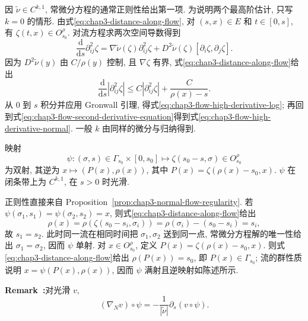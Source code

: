 \begin{Proof}
因 $\widetilde\nu\in C^{k,1}$, 常微分方程的通常正则性给出第一项. 为说明两个最高阶估计, 只写 $k=0$ 的情形. 由式\eqref{eq:chap3-distance-along-flow}, 对 $(s,x)\in E$ 和 $t\in[0,s]$, 有 $\zeta(t,x)\in O_{s_0}^\rho$. 对流方程求两次空间导数得到
\begin{equation}
 \frac{\mathrm d}{\mathrm ds}\partial_{ij}^2\zeta
 =\nabla\widetilde\nu(\zeta)\partial_{ij}^2\zeta
 +D^2\widetilde\nu(\zeta)[\partial_i\zeta,\partial_j\zeta].
 \label{eq:chap3-flow-second-derivative-equation}
\end{equation}
因为 $D^2\widetilde\nu(y)$ 由 $C/\rho(y)$ 控制, 且 $\nabla\zeta$ 有界, 式\eqref{eq:chap3-distance-along-flow}给出
\[
 \frac{\mathrm d}{\mathrm ds}|\partial_{ij}^2\zeta|
 \leq C|\partial_{ij}^2\zeta|+\frac C{\rho(x)-s}.
\]
从 $0$ 到 $s$ 积分并应用 Gronwall 引理, 得式\eqref{eq:chap3-flow-high-derivative-log}; 再回到式\eqref{eq:chap3-flow-second-derivative-equation}得到式\eqref{eq:chap3-flow-high-derivative-normal}. 一般 $k$ 由同样的微分与归纳得到.
\end{Proof}

\begin{Proposition}
\label{prop:chap3-boundary-strip-parametrization}
映射
\[
 \psi:(\sigma,s)\in\Gamma_{s_0}\times[0,s_0]
 \longmapsto\zeta(s_0-s,\sigma)\in O_{s_0}^\rho
\]
为双射, 其逆为 $x\mapsto(P(x),\rho(x))$, 其中 $P(x)=\zeta(\rho(x)-s_0,x)$. $\psi$ 在闭条带上为 $C^{k,1}$, 在 $s>0$ 时光滑.
\end{Proposition}

\begin{Proof}
正则性直接来自 Proposition~\ref{prop:chap3-normal-flow-regularity}. 若 $\psi(\sigma_1,s_1)=\psi(\sigma_2,s_2)=x$, 则式\eqref{eq:chap3-distance-along-flow}给出
\[
 \rho(x)=\rho(\zeta(s_0-s_i,\sigma_i))
 =\rho(\sigma_i)-(s_0-s_i)=s_i,
\]
故 $s_1=s_2$. 此时同一流在相同时间把 $\sigma_1,\sigma_2$ 送到同一点, 常微分方程解的唯一性给出 $\sigma_1=\sigma_2$, 因而 $\psi$ 单射. 对 $x\in O_{s_0}^\rho$, 定义 $P(x)=\zeta(\rho(x)-s_0,x)$. 则式\eqref{eq:chap3-distance-along-flow}给出 $\rho(P(x))=s_0$, 即 $P(x)\in\Gamma_{s_0}$; 流的群性质说明 $x=\psi(P(x),\rho(x))$, 因而 $\psi$ 满射且逆映射如陈述所示.
\end{Proof}

\par\noindent{}\textbf{Remark~\thechapterthreesectionthreeremark:}\label{rem:chap3-boundary-volume-parametrization}\quad 对光滑 $v$,
\begin{equation}
 (\nabla_Nv)\circ\psi=-\frac1{|\widetilde\nu|}\partial_s(v\circ\psi).
 \label{eq:chap3-normal-derivative-parametrized}
\end{equation}

